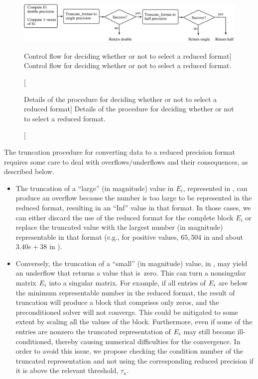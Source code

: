 \begin{figure}[t]
\begin{center}
    \includegraphics[width=\textwidth]{plots/control-flow}
    \caption
    [Control flow for deciding whether or not to select a reduced format]
    {Control flow for deciding whether or not to select a reduced format.}
    \label{2017-adaptive-block-jacobi:fig:control-flow}
\end{center} 
\end{figure}

\begin{figure}[t]
\begin{center}
    
    \caption
        [Details of the procedure for deciding whether 
        or not to select a
            reduced format]
        {Details of the procedure for deciding whether 
        or not to select a
            reduced format.}
    \label{2017-adaptive-block-jacobi:fig:adaptive}
\end{center} 
\end{figure}

The truncation procedure for converting \fpd data to a reduced precision format 
requires
some care to deal with overflows/underflows and their consequences, as 
described below.
\begin{itemize} 
    \item The truncation of a ``large'' (in magnitude) value in
    $E_i$, represented in \fpd, can produce an overflow because the number
    is too large to be represented in the reduced format, resulting in an 
    ``Inf''
    value in that format. In those cases, we can either discard the use of the
    reduced format for the complete block $E_i$ or replace the truncated value 
    with
    the largest number (in magnitude) representable in that format (e.g., for
    positive values, $65,504$ in \fph and about $3.40e+38$ in \fps). 
    \item Conversely, the truncation of a ``small'' (in magnitude) value, 
    in \fpd, may yield an underflow that returns a value that
    is~zero. This can turn a nonsingular matrix $E_i$ into a singular matrix. 
    For
    example, if all entries of $E_i$ are below the minimum representable 
    number in
    the reduced format, the result of truncation will produce a block that 
    comprises
    only zeros, and the preconditioned solver will not converge. This could be 
    mitigated to some extent by scaling all the values of the block. 
    Furthermore, even
    if some of the entries are nonzero the truncated representation of $E_i$ 
    may
    still become ill-conditioned, thereby causing numerical difficulties for 
    the convergence.
    In order to avoid this issue, we propose checking the condition number of 
    the
    truncated representation and not using the corresponding reduced
    precision if it is above the relevant threshold, $\tau_{\kappa}$. 
\end{itemize} 

